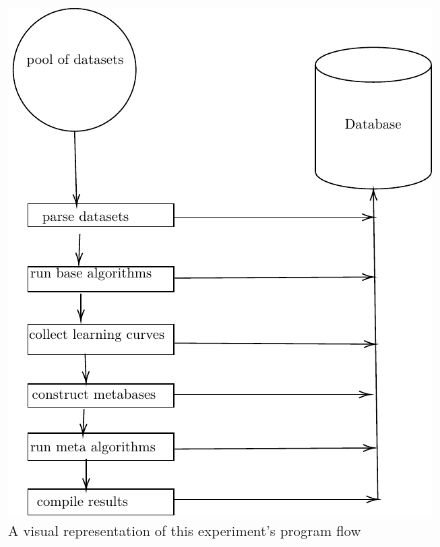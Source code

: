 \begin{figure}
  \includegraphics{Chapters/Images/MetaLearnerFLowchart/MetaLearnerFlowchart.pdf}
  \caption{A visual representation of this experiment's program flow}
\end{figure}

